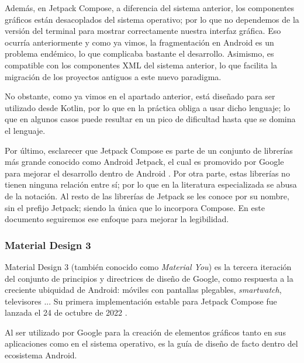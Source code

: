             Además, en Jetpack Compose, a diferencia del sistema anterior, los componentes gráficos están desacoplados 
            del sistema operativo; por lo que no dependemos de la versión del terminal para mostrar correctamente 
            nuestra interfaz gráfica. Eso ocurría anteriormente y como ya vimos, la fragmentación en Android es un 
            problema endémico, lo que complicaba bastante el desarrollo. Asimismo, es compatible con los componentes XML 
            del sistema anterior, lo que facilita la migración de los proyectos antiguos a este nuevo paradigma. 

            No obstante, como ya vimos en el apartado anterior, está diseñado para ser utilizado desde Kotlin, por lo 
            que en la práctica obliga a usar dicho lenguaje; lo que en algunos casos puede resultar en un pico de 
            dificultad hasta que se domina el lenguaje.

            Por último, esclarecer que Jetpack Compose es parte de un conjunto de librerías más grande conocido como 
            Android Jetpack, el cual es promovido por Google para mejorar el desarrollo dentro de Android 
            \cite{huaman_que_2018} \cite{noauthor_recursos_nodate}. Por otra
            parte, estas librerías no tienen ninguna relación entre sí; por lo que en la literatura especializada se 
            abusa de la notación. Al resto de las librerías de Jetpack se les conoce
            por su nombre, sin el prefijo Jetpack; siendo la única que lo incorpora Compose. En este documento 
            seguiremos ese enfoque para mejorar la legibilidad.
        
        \subsubsection{Material Design 3}
            Material Design 3 (también conocido como \textit{Material You}) es la tercera iteración del 
            conjunto de principios y directrices de diseño de Google, 
            como respuesta a la creciente ubiquidad de Android: móviles con pantallas
            plegables, \textit{smartwatch}, televisores \cite{ramirez_que_2022}... 
            Su primera implementación estable para Jetpack Compose fue lanzada el 
            24 de octubre de 2022 \cite{singh_material_2022}. \newline
            
            Al ser utilizado por Google para la creación de elementos 
            gráficos tanto en sus aplicaciones como en el sistema operativo, es la guía de diseño de facto dentro del
            ecosistema Android. \newline

